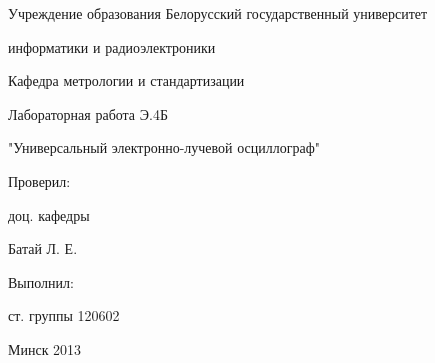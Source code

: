 \thispagestyle{empty}

\begin{center}
Учреждение образования
Белорусский государственный университет\par
информатики и радиоэлектроники\par 
\vspace{5mm}
Кафедра метрологии и стандартизации\par
\par

\end{center}

\vspace{70mm}

\begin{center}
Лабораторная работа Э.4Б\par
"Универсальный электронно-лучевой осциллограф"\par
\end{center}

\vspace{50mm}

\begin{multicols}{2}
Проверил:

доц. кафедры

Батай Л. Е.
\begin{flushright}

Выполнил:

ст. группы 120602



\end{flushright}
\end{multicols}

\vspace{50mm}
\begin{center}
{Минск 2013}
\end{center}

\newpage
